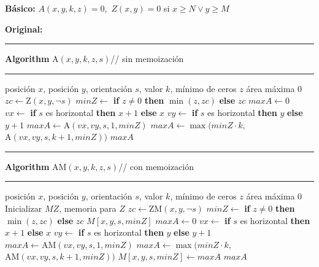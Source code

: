\documentclass[a4paper, 12pt]{article}
\begin{document}
\textbf{Básico:} $A(x,y,k,z) = 0$,\ $Z(x,y) = 0$ si $x \geq N \lor y \geq M$

\textbf{Original:}\\
\begin{minipage}[t]{78mm}
  \hrule{\bf Algorithm} A$(x,y,k,z,s)$\hfill// sin memoización\hrule
  \begin{algorithmic}[1]
    \mInput posición $x$, posición $y$, orientación $s$, valor $k$, mínimo de ceros $z$
    \mOutput área máxima
    \Return $0$
    \EndIf
    \State $zc \gets \text{Z}(x, y, \neg s)$
    \State $minZ \gets$ \textbf{if} $z \neq 0$ \textbf{then} $\min(z, zc)$ \textbf{else} $zc$
    \State $maxA \gets 0$
    \State $vx \gets$ \textbf{if} $s$ es horizontal \textbf{then} $x + 1$ \textbf{else} $x$
    \State $vy \gets$ \textbf{if} $s$ es horizontal \textbf{then} $y$ \textbf{else} $y+1$
    \State $maxA \gets \text{A}(vx, vy, s, 1, minZ)$
    \Else
    \State $maxA \gets \max(minZ \cdot k,$ \\
      \hfill $\text{A}(vx, vy, s, k + 1, minZ))$
    \EndIf
    \Return $maxA$
  \end{algorithmic}
\end{minipage}\hfill
\begin{minipage}[t]{78mm}
  \hrule{\bf Algorithm} AM$(x,y,k,z,s)$\hfill// con memoización\hrule
  \begin{algorithmic}[1]
    \mInput posición $x$, posición $y$, orientación $s$, valor $k$, mínimo de ceros $z$
    \mOutput área máxima
    \Return $0$
    \EndIf
    \State Inicializar $MZ$, memoria para $Z$
    \State $zc \gets \text{ZM}(x, y, \neg s)$
    \State $minZ \gets$ \textbf{if} $z \neq 0$ \textbf{then} $\min(z, zc)$ \textbf{else} $zc$
    \Return $M[x,y,s,minZ]$
    \EndIf
    \State $maxA \gets 0$
    \State $vx \gets$ \textbf{if} $s$ es horizontal \textbf{then} $x + 1$ \textbf{else} $x$
    \State $vy \gets$ \textbf{if} $s$ es horizontal \textbf{then} $y$ \textbf{else} $y+1$
    \State $maxA \gets \text{AM}(vx, vy, s, 1, minZ)$
    \Else
    \State $maxA \gets \max(minZ \cdot k,$ \\
      \hfill $\text{AM}(vx, vy, s, k + 1, minZ))$
    \EndIf
    \State $M[x,y,s,minZ] \gets maxA$
    \Return $maxA$
  \end{algorithmic}

\end{minipage}\hfill\\[6mm]
\end{document}
